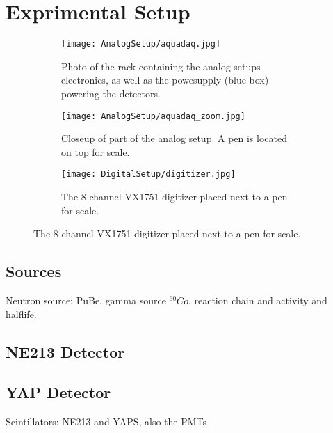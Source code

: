 \documentclass[main.tex]{subfiles}
\begin{document}
\section{Exprimental Setup}\label{sec:exp_setup}

\begin{figure}[ht]
	\begin{subfigure}[b]{0.38\textwidth}
	    \centering
			\captionsetup{width=.80\linewidth}	
    	    \texttt{[image: AnalogSetup/aquadaq.jpg]}
        	\caption{Photo of the rack containing the analog setups electronics, as well as the powesupply (blue box) powering the detectors.}
	    \label{fig:aquadaq_image} 
	\end{subfigure}
	\begin{subfigure}[b]{0.30\textwidth}
	    \centering
	    	\captionsetup{width=1\linewidth}	
    	    \texttt{[image: AnalogSetup/aquadaq\_zoom.jpg]}
        	\caption{Closeup of part of the analog setup. A pen is located on top for scale.}
	    \label{fig:aquadaq_zoom_image} 
	\end{subfigure}
	\begin{subfigure}[b]{0.3\textwidth}
    	\centering
			\captionsetup{width=.6\linewidth}	
        	\texttt{[image: DigitalSetup/digitizer.jpg]}
        	\caption{The 8 channel VX1751 digitizer placed next to a pen for scale.}
    	\label{fig:digitizer_image} 
    \end{subfigure}
\end{figure}

\subsection{Sources}
Neutron source: PuBe, gamma source $^{60}Co$, reaction chain and activity and halflife.



\subsection{NE213 Detector}

\subsection{YAP Detector}
Scintillators: NE213 and YAPS, also the PMTs
\end{document}
